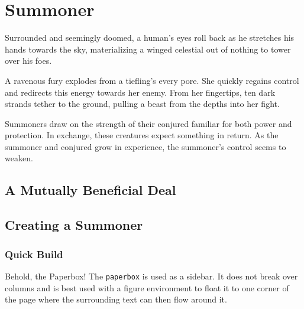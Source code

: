 \documentclass[letterpaper,10pt,twoside,twocolumn,openany]{dndbook}
\begin{document}
\section{Summoner}

Surrounded and seemingly doomed, a human's eyes roll back as he stretches his hands towards the sky, materializing a winged celestial out of nothing to tower over his foes.

  A ravenous fury explodes from a tiefling's every pore. She quickly regains control and redirects this energy towards her enemy. From her fingertips, ten dark strands tether to the ground, pulling a beast from the depths into her fight.

  Summoners draw on the strength of their conjured familiar for both power and protection. In exchange, these creatures expect something in return. As the summoner and conjured grow in experience, the summoner's control seems to weaken.

\subsection{A Mutually Beneficial Deal}
\lipsum[3]

\subsection{Creating a Summoner}
\lipsum[3]

\subsubsection{Quick Build}
\lipsum[1]

\begin{paperbox}[float=!t]{Behold, the Paperbox!}
  The \lstinline!paperbox! is used as a sidebar. It does not break over columns and is best used with a figure environment to float it to one corner of the page where the surrounding text can then flow around it.
\end{paperbox}
\end{document}
